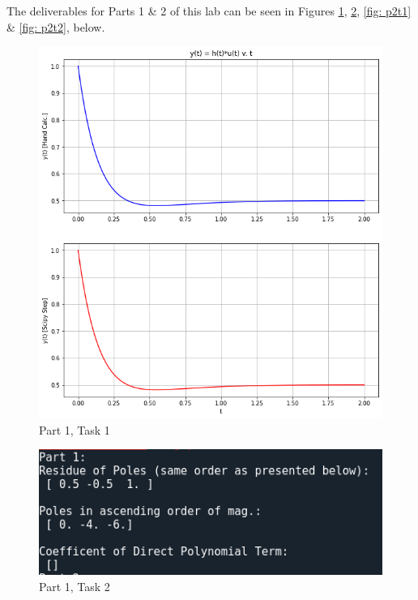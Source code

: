 \documentclass[12pt]{report}
\begin{document}
The deliverables for Parts 1 \& 2 of this lab can be seen in Figures \ref{fig: p1t1}, \ref{fig: p1t2}, \ref{fig: p2t1} \& \ref{fig: p2t2}, below.
\\
\begin{figure}[h!]
  \centering
  \includegraphics[scale=0.5]{p1t1.png}
  \caption{Part 1, Task 1}
  \label{fig: p1t1}
\end{figure}
\begin{figure}[h!]
  \centering
  \includegraphics[scale=0.5]{p1t2.png}
  \caption{Part 1, Task 2}
  \label{fig: p1t2}
\end{figure}
\end{document}
